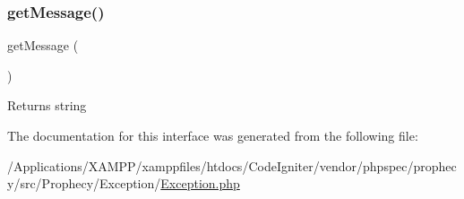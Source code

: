 \subsubsection{\texorpdfstring{get\+Message()}{getMessage()}}
{\footnotesize\ttfamily get\+Message (\begin{DoxyParamCaption}{ }\end{DoxyParamCaption})}

\begin{DoxyReturn}{Returns}
string 
\end{DoxyReturn}


The documentation for this interface was generated from the following file\+:\begin{DoxyCompactItemize}
\item 
/\+Applications/\+X\+A\+M\+P\+P/xamppfiles/htdocs/\+Code\+Igniter/vendor/phpspec/prophecy/src/\+Prophecy/\+Exception/\mbox{\hyperlink{phpspec_2prophecy_2src_2_prophecy_2_exception_2_exception_8php}{Exception.\+php}}\end{DoxyCompactItemize}
